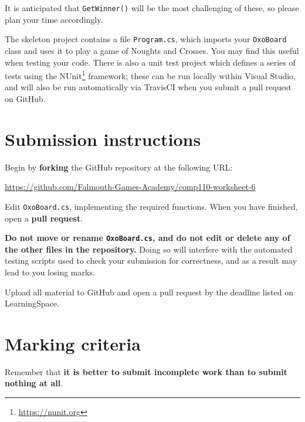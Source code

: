 \documentclass{../../../fal_assignment}
\begin{document}
It is anticipated that \lstinline{GetWinner()} will be the most challenging of these,
so please plan your time accordingly.

The skeleton project contains a file \texttt{Program.cs}, which imports your \lstinline{OxoBoard} class
and uses it to play a game of Noughts and Crosses. You may find this useful when testing your code.
There is also a unit test project which defines a series of tests using the NUnit\footnote{\url{https://nunit.org}} framework;
these can be run locally within Visual Studio, and will also be run automatically via TravisCI when you submit a pull request
on GitHub.

\section*{Submission instructions}

Begin by \textbf{forking} the GitHub repository at the following URL:

\url{https://github.com/Falmouth-Games-Academy/comp110-worksheet-6}

Edit \texttt{OxoBoard.cs}, implementing the required functions.
When you have finished, open a \textbf{pull request}.

\textbf{Do not move or rename \texttt{OxoBoard.cs}, and do not edit or delete any of the other files in the repository.}
Doing so will interfere with the automated testing scripts used to check your submission for correctness,
and as a result may lead to you losing marks.

Upload all material to GitHub and open a pull request by the deadline listed on LearningSpace.

\section*{Marking criteria}

Remember that \textbf{it is better to submit incomplete work than to submit nothing at all}.
\end{document}
